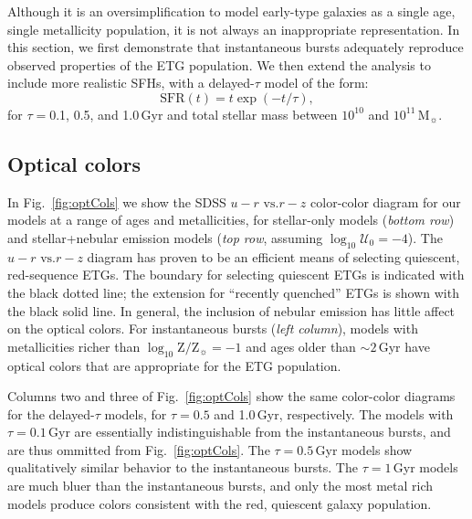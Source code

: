 \documentclass[preprint2]{aastex62}
\newcommand\vs{\ensuremath{\mathrm{vs.}}\xspace}
\newcommand\Msun{\ensuremath{\,\mathrm{M_{\sun}}}\xspace}
\newcommand{\logten}{\ensuremath{\log_{10}}}
\newcommand{\logZeq}[1]{\ensuremath{\logten \mathrm{Z}/\mathrm{Z}_{\sun} = #1}}
\newcommand{\logUeq}[1]{\ensuremath{\logten \mathcal{U}_0 = #1}}
\newcommand{\Gyr}{$\,$Gyr\xspace}
\begin{document}
Although it is an oversimplification to model early-type galaxies as a single age, single metallicity population, it is not always an inappropriate representation. In this section, we first demonstrate that instantaneous bursts adequately reproduce observed properties of the ETG population. We then extend the analysis to include more realistic SFHs, with a delayed-$\tau$ model of the form:
\begin{equation}
    \mathrm{SFR}(t) = t \exp (-t/\tau),
\end{equation}
for $\tau = $0.1, 0.5, and 1.0\Gyr and total stellar mass between $10^{10}$ and $10^{11}$\Msun \citep{Thomas+2005, Choi+2014}.

\subsection{Optical colors} \label{sec:stars:continuum:colors}

In Fig.~\ref{fig:optCols} we show the SDSS $u-r$ \vs $r-z$ color-color diagram for our models at a range of ages and metallicities, for stellar-only models (\emph{bottom row}) and stellar+nebular emission models (\emph{top row}, assuming \logUeq{-4}). The $u-r$ \vs $r-z$ diagram has proven to be an efficient means of selecting quiescent, red-sequence ETGs. The \citet{Holden+2012} boundary for selecting quiescent ETGs is indicated with the black dotted line; the \citet{McIntosh+2014} extension for ``recently quenched'' ETGs is shown with the black solid line. In general, the inclusion of nebular emission has little affect on the optical colors. For instantaneous bursts (\emph{left column}), models with metallicities richer than \logZeq{-1} and ages older than $\sim2$\Gyr have optical colors that are appropriate for the ETG population.

Columns two and three of Fig.~\ref{fig:optCols} show the same color-color diagrams for the delayed-$\tau$ models, for $\tau = 0.5$ and 1.0\Gyr, respectively. The models with $\tau=0.1$\Gyr are essentially indistinguishable from the instantaneous bursts, and are thus ommitted from Fig.~\ref{fig:optCols}. The $\tau=0.5$\Gyr models show qualitatively similar behavior to the instantaneous bursts. The $\tau=1$\Gyr models are much bluer than the instantaneous bursts, and only the most metal rich models produce colors consistent with the red, quiescent galaxy population.
\end{document}
